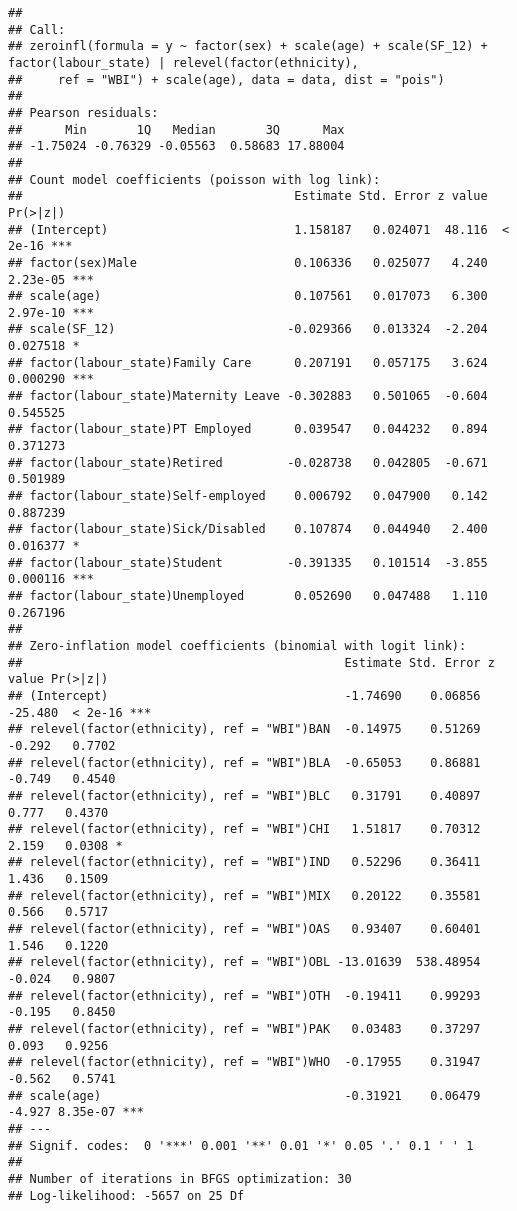 \documentclass[
]{article}
\begin{document}
\begin{verbatim}
## 
## Call:
## zeroinfl(formula = y ~ factor(sex) + scale(age) + scale(SF_12) + factor(labour_state) | relevel(factor(ethnicity), 
##     ref = "WBI") + scale(age), data = data, dist = "pois")
## 
## Pearson residuals:
##      Min       1Q   Median       3Q      Max 
## -1.75024 -0.76329 -0.05563  0.58683 17.88004 
## 
## Count model coefficients (poisson with log link):
##                                      Estimate Std. Error z value Pr(>|z|)    
## (Intercept)                          1.158187   0.024071  48.116  < 2e-16 ***
## factor(sex)Male                      0.106336   0.025077   4.240 2.23e-05 ***
## scale(age)                           0.107561   0.017073   6.300 2.97e-10 ***
## scale(SF_12)                        -0.029366   0.013324  -2.204 0.027518 *  
## factor(labour_state)Family Care      0.207191   0.057175   3.624 0.000290 ***
## factor(labour_state)Maternity Leave -0.302883   0.501065  -0.604 0.545525    
## factor(labour_state)PT Employed      0.039547   0.044232   0.894 0.371273    
## factor(labour_state)Retired         -0.028738   0.042805  -0.671 0.501989    
## factor(labour_state)Self-employed    0.006792   0.047900   0.142 0.887239    
## factor(labour_state)Sick/Disabled    0.107874   0.044940   2.400 0.016377 *  
## factor(labour_state)Student         -0.391335   0.101514  -3.855 0.000116 ***
## factor(labour_state)Unemployed       0.052690   0.047488   1.110 0.267196    
## 
## Zero-inflation model coefficients (binomial with logit link):
##                                             Estimate Std. Error z value Pr(>|z|)    
## (Intercept)                                 -1.74690    0.06856 -25.480  < 2e-16 ***
## relevel(factor(ethnicity), ref = "WBI")BAN  -0.14975    0.51269  -0.292   0.7702    
## relevel(factor(ethnicity), ref = "WBI")BLA  -0.65053    0.86881  -0.749   0.4540    
## relevel(factor(ethnicity), ref = "WBI")BLC   0.31791    0.40897   0.777   0.4370    
## relevel(factor(ethnicity), ref = "WBI")CHI   1.51817    0.70312   2.159   0.0308 *  
## relevel(factor(ethnicity), ref = "WBI")IND   0.52296    0.36411   1.436   0.1509    
## relevel(factor(ethnicity), ref = "WBI")MIX   0.20122    0.35581   0.566   0.5717    
## relevel(factor(ethnicity), ref = "WBI")OAS   0.93407    0.60401   1.546   0.1220    
## relevel(factor(ethnicity), ref = "WBI")OBL -13.01639  538.48954  -0.024   0.9807    
## relevel(factor(ethnicity), ref = "WBI")OTH  -0.19411    0.99293  -0.195   0.8450    
## relevel(factor(ethnicity), ref = "WBI")PAK   0.03483    0.37297   0.093   0.9256    
## relevel(factor(ethnicity), ref = "WBI")WHO  -0.17955    0.31947  -0.562   0.5741    
## scale(age)                                  -0.31921    0.06479  -4.927 8.35e-07 ***
## ---
## Signif. codes:  0 '***' 0.001 '**' 0.01 '*' 0.05 '.' 0.1 ' ' 1 
## 
## Number of iterations in BFGS optimization: 30 
## Log-likelihood: -5657 on 25 Df
\end{verbatim}
\end{document}
